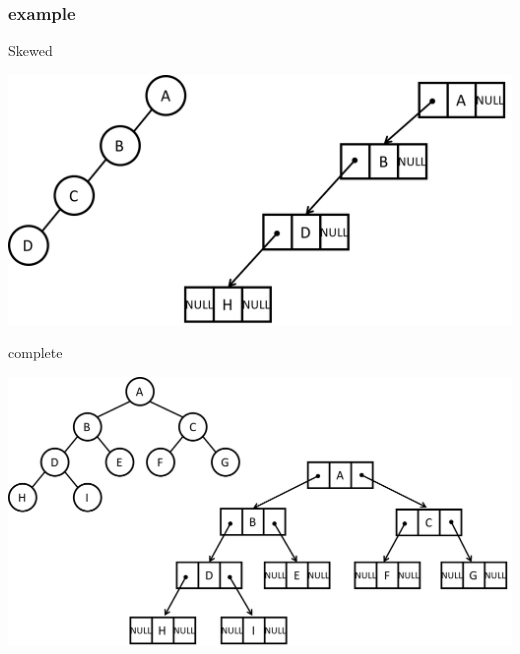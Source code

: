 \documentclass[newPxFont,sthlmFooter,nooffset]{beamer}
\begin{document}
\begin{frame}[t]
  \frametitle{example}
Skewed

  \begin{center}
\vspace{-1em}
    \includegraphics[height=0.3\textheight]{figures/fig08_linked_list_skewed.png}
  \end{center}

complete 
  \begin{center}
\vspace{-1em}
    \includegraphics[height=0.4\textheight]{figures/fig08_linked_list_complete.png}
  \end{center}

\end{frame}
\end{document}
